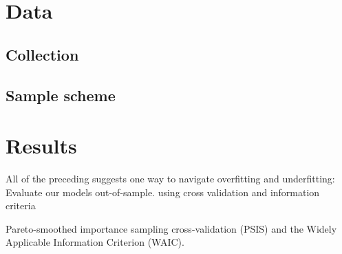 
\section{Data}

\subsection{Collection}


\subsection{Sample scheme}



\section{Results}

All of the preceding suggests one way to navigate overfitting and underfitting: Evaluate our models out-of-sample. using cross validation and information criteria

Pareto-smoothed importance sampling cross-validation (PSIS) and the  Widely Applicable Information Criterion (WAIC).